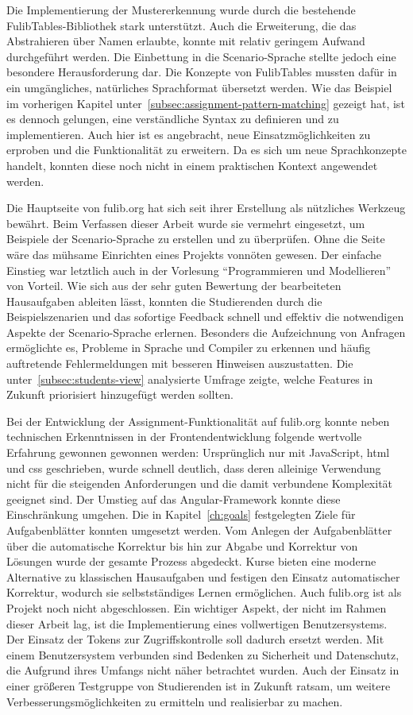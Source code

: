 Die Implementierung der Mustererkennung wurde durch die bestehende FulibTables-Bibliothek stark unterstützt.
Auch die Erweiterung, die das Abstrahieren über Namen erlaubte, konnte mit relativ geringem Aufwand durchgeführt werden.
Die Einbettung in die Scenario-Sprache stellte jedoch eine besondere Herausforderung dar.
Die Konzepte von FulibTables mussten dafür in ein umgängliches, natürliches Sprachformat übersetzt werden.
Wie das Beispiel im vorherigen Kapitel unter~\ref{subsec:assignment-pattern-matching} gezeigt hat, ist es dennoch gelungen, eine verständliche Syntax zu definieren und zu implementieren.
Auch hier ist es angebracht, neue Einsatzmöglichkeiten zu erproben und die Funktionalität zu erweitern.
Da es sich um neue Sprachkonzepte handelt, konnten diese noch nicht in einem praktischen Kontext angewendet werden.

Die Hauptseite von fulib.org hat sich seit ihrer Erstellung als nützliches Werkzeug bewährt.
Beim Verfassen dieser Arbeit wurde sie vermehrt eingesetzt, um Beispiele der Scenario-Sprache zu erstellen und zu überprüfen.
Ohne die Seite wäre das mühsame Einrichten eines Projekts vonnöten gewesen.
Der einfache Einstieg war letztlich auch in der Vorlesung ``Programmieren und Modellieren'' von Vorteil.
Wie sich aus der sehr guten Bewertung der bearbeiteten Hausaufgaben ableiten lässt, konnten die Studierenden durch die Beispielszenarien und das sofortige Feedback schnell und effektiv die notwendigen Aspekte der Scenario-Sprache erlernen.
Besonders die Aufzeichnung von Anfragen ermöglichte es, Probleme in Sprache und Compiler zu erkennen und häufig auftretende Fehlermeldungen mit besseren Hinweisen auszustatten.
Die unter~\ref{subsec:students-view} analysierte Umfrage zeigte, welche Features in Zukunft priorisiert hinzugefügt werden sollten.

Bei der Entwicklung der Assignment-Funktionalität auf fulib.org konnte neben technischen Erkenntnissen in der Frontendentwicklung folgende wertvolle Erfahrung gewonnen gewonnen werden:
Ursprünglich nur mit JavaScript, \ac{html} und \ac{css} geschrieben, wurde schnell deutlich, dass deren alleinige Verwendung nicht für die steigenden Anforderungen und die damit verbundene Komplexität geeignet sind.
Der Umstieg auf das Angular-Framework konnte diese Einschränkung umgehen.
Die in Kapitel~\ref{ch:goals} festgelegten Ziele für Aufgabenblätter konnten umgesetzt werden.
Vom Anlegen der Aufgabenblätter über die automatische Korrektur bis hin zur Abgabe und Korrektur von Lösungen wurde der gesamte Prozess abgedeckt.
Kurse bieten eine moderne Alternative zu klassischen Hausaufgaben und festigen den Einsatz automatischer Korrektur, wodurch sie selbstständiges Lernen ermöglichen.
Auch fulib.org ist als Projekt noch nicht abgeschlossen.
Ein wichtiger Aspekt, der nicht im Rahmen dieser Arbeit lag, ist die Implementierung eines vollwertigen Benutzersystems.
Der Einsatz der Tokens zur Zugriffskontrolle soll dadurch ersetzt werden.
Mit einem Benutzersystem verbunden sind Bedenken zu Sicherheit und Datenschutz, die Aufgrund ihres Umfangs nicht näher betrachtet wurden.
Auch der Einsatz in einer größeren Testgruppe von Studierenden ist in Zukunft ratsam, um weitere Verbesserungsmöglichkeiten zu ermitteln und realisierbar zu machen.
